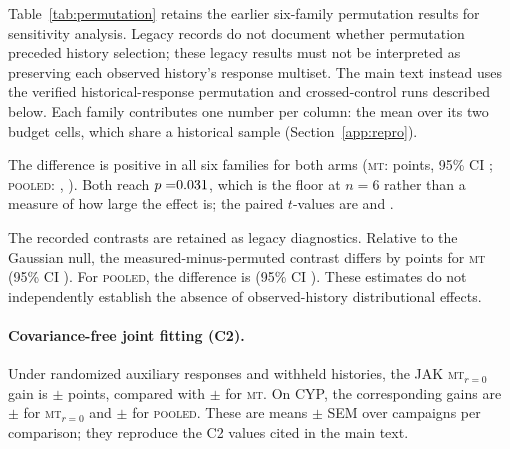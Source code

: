 \documentclass[10pt]{article}
\newcommand{\stl}{\textsc{stl}}
\newcommand{\mt}{\textsc{mt}}
\newcommand{\pooled}{\textsc{pooled}}
\newcommand{\mtzero}{\textsc{mt}$_{r=0}$}
\begin{document}
Table~\ref{tab:permutation} retains the earlier six-family permutation
results for sensitivity analysis. Legacy records do not document
whether permutation preceded history selection; these legacy results must
not be interpreted as preserving each observed history's response multiset.
The main text instead uses the verified historical-response permutation
and crossed-control runs described below. Each family contributes one number per column: the
mean over its two budget cells, which share a historical sample
(Section~\ref{app:repro}).

\begin{table}[htbp]
\centering\small

\caption{Change in top-10 recall relative to \stl{} (percentage points) under
uniform histories in the legacy measured and permuted run classes.
Historical observation locations are matched. Preservation of the response
distribution within the observed historical sample was not independently
verified for this run class; it is not the new main-text null. Generated by
\texttt{scripts/family\_inference\_audit.py} from the stored campaigns.}
\label{tab:permutation}
\end{table}

The difference is positive in all six families for both arms
(\mt{}: \permMtGvalueShuf{} points, 95\% CI \permCiMtGvalueShuf{};
\pooled{}: \permPooledGvalueShuf{}, \permCiPooledGvalueShuf{}). Both reach
$p=\permPMtGvalueShuf{}$, which is the floor \permPFloor{} at $n=6$ rather
than a measure of how large the effect is; the paired $t$-values are
\permPtMtGvalueShuf{} and \permPtPooledGvalueShuf{}.

The recorded contrasts are retained as legacy diagnostics. Relative to the
Gaussian null, the measured-minus-permuted contrast differs by
\permMtNullDifference{} points for \mt{}
(95\% CI \permCiMtNullDifference{}).
For \pooled{}, the difference is \permPooledNullDifference{}
(95\% CI \permCiPooledNullDifference{}).
These estimates do not independently establish the absence of
observed-history distributional effects.

\paragraph{Covariance-free joint fitting (C2).}
Under randomized auxiliary responses and withheld histories, the JAK
\mtzero{} gain is \valMechJakMtRZero{} $\pm$ \semMechJakMtRZero{}
points, compared with \valMechJakMt{} $\pm$ \semMechJakMt{} for \mt{}.
On CYP, the corresponding gains are \valMechCypMtRZero{} $\pm$
\semMechCypMtRZero{} for \mtzero{} and \valMechCypPooled{} $\pm$
\semMechCypPooled{} for \pooled{}.
These are means $\pm$ SEM over \nMechJakMtRZero{} campaigns per
comparison; they reproduce the C2 values cited in the main text.
\end{document}
